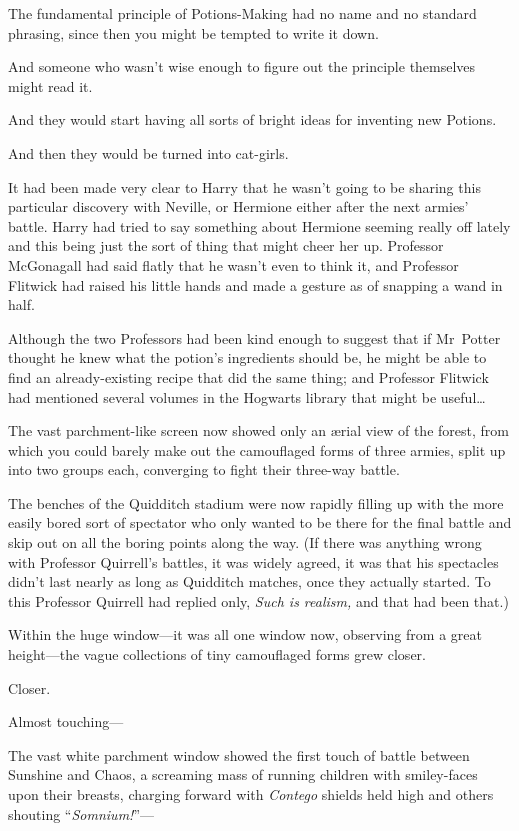 The fundamental principle of Potions-Making had no name and no standard phrasing, since then you might be tempted to write it down.

And someone who wasn’t wise enough to figure out the principle themselves might read it.

And they would start having all sorts of bright ideas for inventing new Potions.

And then they would be turned into cat-girls.

It had been made very clear to Harry that he wasn’t going to be sharing this particular discovery with Neville, or Hermione either after the next armies’ battle. Harry had tried to say something about Hermione seeming really off lately and this being just the sort of thing that might cheer her up. Professor McGonagall had said flatly that he wasn’t even to think it, and Professor Flitwick had raised his little hands and made a gesture as of snapping a wand in half.

Although the two Professors had been kind enough to suggest that if Mr~Potter thought he knew what the potion’s ingredients should be, he might be able to find an already-existing recipe that did the same thing; and Professor Flitwick had mentioned several volumes in the Hogwarts library that might be useful…

\later

The vast parchment-like screen now showed only an ærial view of the forest, from which you could barely make out the camouflaged forms of three armies, split up into two groups each, converging to fight their three-way battle.

The benches of the Quidditch stadium were now rapidly filling up with the more easily bored sort of spectator who only wanted to be there for the final battle and skip out on all the boring points along the way. (If there was anything wrong with Professor Quirrell’s battles, it was widely agreed, it was that his spectacles didn’t last nearly as long as Quidditch matches, once they actually started. To this Professor Quirrell had replied only, \emph{Such is realism,} and that had been that.)

Within the huge window—it was all one window now, observing from a great height—the vague collections of tiny camouflaged forms grew closer.

Closer.

Almost touching—

\later

The vast white parchment window showed the first touch of battle between Sunshine and Chaos, a screaming mass of running children with smiley-faces upon their breasts, charging forward with \emph{Contego} shields held high and others shouting “\emph{Somnium!}”—


